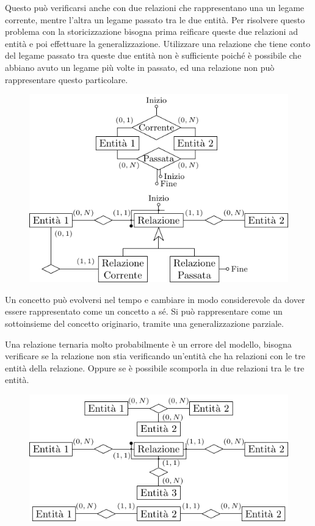 \documentclass{article}
\numberwithin{equation}{subsection}
\begin{document}
Questo può verificarsi anche con due relazioni che rappresentano una un legame corrente, mentre 
l'altra un legame passato tra le due entità. Per risolvere questo problema con la storicizzazione 
bisogna prima reificare queste due relazioni ad entità e poi effettuare la generalizzazione. Utilizzare 
una relazione che tiene conto del legame passato tra queste due entità non è sufficiente poiché 
è possibile che abbiano avuto un legame più volte in passato, ed una relazione non può 
rappresentare questo particolare. 

\begin{figure}[H]%
    \centering%
    \includegraphics[scale=1.25]{storicizzazione_concetto_relazione.pdf}%
\end{figure}

Un concetto può evolversi nel tempo e cambiare in modo considerevole da dover essere rappresentato 
come un concetto a sé. Si può rappresentare come un sottoinsieme del concetto originario, 
tramite una generalizzazione parziale. 

Una relazione ternaria molto probabilmente è un errore del modello, bisogna verificare 
se la relazione non stia verificando un'entità che ha relazioni con le tre entità della 
relazione. Oppure se è possibile scomporla in due relazioni tra le tre entità. 

\begin{figure}[H]%
    \centering
    \includegraphics[scale=1.2]{reificazione_relationship_ternaria.pdf}%
\end{figure}
\end{document}
